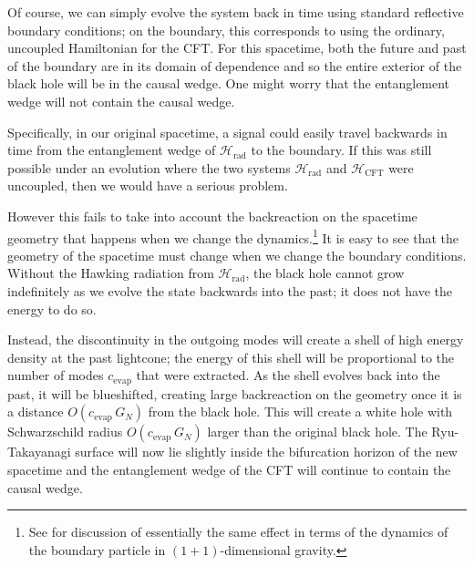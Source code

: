 \documentclass[11pt,a4paper]{article}
\begin{document}
Of course, we can simply evolve the system back in time using standard reflective boundary conditions; on the boundary, this corresponds to using the ordinary, uncoupled Hamiltonian for the CFT. For this spacetime, both the future and past of the boundary are in its domain of dependence and so the entire exterior of the black hole will be in the causal wedge. One might worry that the entanglement wedge will not contain the causal wedge.

Specifically, in our original spacetime, a signal could easily travel backwards in time from the entanglement wedge of $\mathcal{H}_\text{rad}$ to the boundary. If this was still possible under an evolution where the two systems $\mathcal{H}_\text{rad}$ and $\mathcal{H}_\text{CFT}$ were uncoupled, then we would have a serious problem.

However this fails to take into account the backreaction on the spacetime geometry that happens when we change the dynamics.\footnote{See \cite{almheiri2018holographic} for discussion of essentially the same effect in terms of the dynamics of the boundary particle in $(1+1)$-dimensional gravity.} It is easy to see that the geometry of the spacetime must change when we change the boundary conditions. Without the Hawking radiation from $\mathcal{H}_\text{rad}$, the black hole cannot grow indefinitely as we evolve the state backwards into the past; it does not have the energy to do so. 

Instead, the discontinuity in the outgoing modes will create a shell of high energy density at the past lightcone; the energy of this shell will be proportional to the number of modes $c_\text{evap}$ that were extracted. As the shell evolves back into the past, it will be blueshifted, creating large backreaction on the geometry once it is a distance $O(c_\text{evap}\, G_N)$ from the black hole. This will create a white hole with Schwarzschild radius $O(c_\text{evap}\,G_N)$ larger than the original black hole. The Ryu-Takayanagi surface will now lie slightly inside the bifurcation horizon of the new spacetime and the entanglement wedge of the CFT will continue to contain the causal wedge. 
\end{document}

